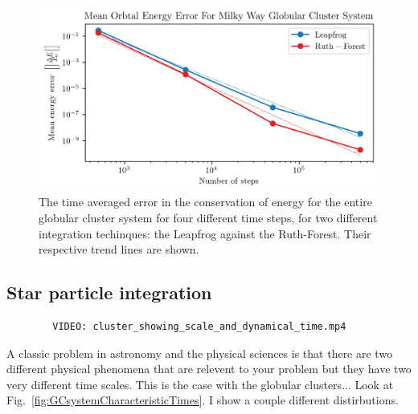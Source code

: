         \begin{figure}
            \centering
            \includegraphics[width=\linewidth]{images/numericalErrorMeanEnergyErrorRuthForestLeapFrog.png}
            \caption{The time averaged error in the conservation of energy for the entire globular cluster system for four different time steps, for two different integration techinques: the Leapfrog against the Ruth-Forest. Their respective trend lines are shown.}
            \label{fig:numericalErrorMeanEnergyErrorRuthForestLeapFrog}
        \end{figure}

    \subsection{Star particle integration}

        \begin{verbatim}
        VIDEO: cluster_showing_scale_and_dynamical_time.mp4
        \end{verbatim}
        
        A classic problem in astronomy and the physical sciences is that there are two different physical phenomena that are relevent to your problem but they have two very different time scales. This is the case with the globular clusters... Look at Fig.~\ref{fig:GCsystemCharacteristicTimes}. I show a couple different distirbutions.  

